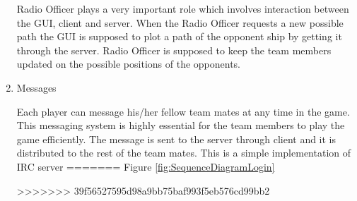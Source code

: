 \begin{enumerate}
Radio Officer plays a very important role which involves interaction between the GUI, client and server. When the Radio Officer requests a new possible path the GUI is supposed to plot a path of the opponent ship by getting it through the server. Radio Officer is supposed to keep the team members updated on the possible positions of the opponents.

\item Messages


Each player can message his/her fellow team mates at any time in the game. This messaging system is highly essential for the team members to play the game efficiently. The message is sent to the server through client and it is distributed to the rest of the team mates. This is a simple implementation of IRC server
=======
Figure \ref{fig:SequenceDiagramLogin}

>>>>>>> 39f56527595d98a9bb75baf993f5eb576cd99bb2

\end{enumerate}